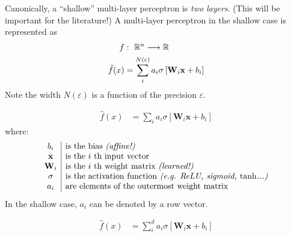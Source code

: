 \begin{frame}
    Canonically, a ``shallow'' multi-layer perceptron is \textit{two layers}. (This will be important
    for the literature!)
    A multi-layer perceptron in the shallow case is represented as
    \begin{align*}
    f &: ~ \mathbb{R}^n \longrightarrow \mathbb{R} \\
    \hat{f}(x) &=  \sum_i^{N(\varepsilon)} a_i \sigma \left[\mathbf{W}_i \mathbf{x} + b_i \right]
    \end{align*}
    Note the width $N(\varepsilon)$ is a function of the precision $\varepsilon$.
\end{frame}

\begin{frame}
    \begin{align*}
        \hat{f}(x) &=  \sum_i a_i \sigma \left[\mathbf{W}_i \mathbf{x} + b_i \right]
    \end{align*}
    where:
    \[
        \begin{array}{c|l}
            b_i & \text{is the bias \textit{(affine!)}} \\
            \mathbf{x} & \text{is the $i$ th input vector} \\
            \mathbf{W}_i & \text{is the $i$ th weight matrix \textit{(learned!)}} \\
            \sigma & \text{is the activation function \textit{(e.g. ReLU, sigmoid, $\tanh$...)}} \\
            a_i & \text{are elements of the outermost weight matrix}
        \end{array}
    \]
    In the shallow case, $a_i$ can be denoted by a row vector.
\end{frame}
\begin{frame}
    \begin{align*}
        \hat{f}(x) &=  \sum_i^d a_i \sigma \left[\mathbf{W}_i \mathbf{x} + b_i \right]
    \end{align*}
\end{frame}
